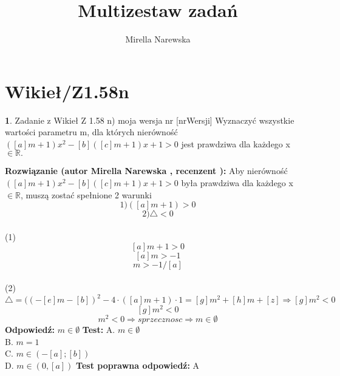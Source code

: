 \documentclass[12pt, a4paper]{article}
\title{Multizestaw zadań}
\author{Mirella Narewska}
\date{}
\theoremstyle{definition} %
\newtheorem{zad}{}
\newcommand{\kategoria}[1]{\section{#1}} %
\newcommand{\zadStart}[1]{\begin{zad}#1\newline} %
\newcommand{\zadStop}{\end{zad}}   %
\newcommand{\rozwStart}[2]{\noindent \textbf{Rozwiązanie (autor #1 , recenzent #2): }\newline} %
\newcommand{\odpStart}{\noindent \textbf{Odpowiedź:}\newline}    %
\newcommand{\odpStop}{\newline}                                             %
\newcommand{\testStart}{\noindent \textbf{Test:}\newline} %
\newcommand{\testStop}{\newline} %
\newcommand{\kluczStart}{\noindent \textbf{Test poprawna odpowiedź:}\newline} %
\newcommand{\kluczStop}{\newline} %
\begin{document}
\maketitle


\kategoria{Wikieł/Z1.58n}
\zadStart{Zadanie z Wikieł Z 1.58 n) moja wersja nr [nrWersji]}
Wyznaczyć wszystkie wartości parametru m, dla których nierówność $([a]m+1)x^2-[b]([c]m+1)x+1>0$ jest prawdziwa dla każdego x $\in \mathbb{R}.$
\zadStop
\rozwStart{Mirella Narewska}{}
Aby nierówność $([a]m+1)x^2-[b]([c]m+1)x+1>0$ była prawdziwa dla każdego  x $\in \mathbb{R}$, muszą zostać spełnione 2 warunki
$$1) ([a]m+1)>0$$
$$2)  \triangle<0$$
\\
(1)
\\
$$[a]m+1>0$$
$$[a]m>-1$$
$$m>-1/[a]$$
\\
(2)
\\
$$\triangle=((-[e]m -[b])^2-4\cdot ([a]m+1)\cdot 1= [g]m^2 + [h]m +[z] \Rightarrow [g]m^2<0$$
$$[g]m^2<0$$
$$m^2<0 \Rightarrow sprzecznosc \Rightarrow m \in \emptyset$$
\odpStart
$m \in \emptyset$
\odpStop
\testStart
A. $m \in \emptyset$ \\
B. $m=1$ \\
C. $m \in (-[a];[b])$ \\
D. $m \in (0,[a])$ 
\testStop
\kluczStart
A
\kluczStop
\end{document}

